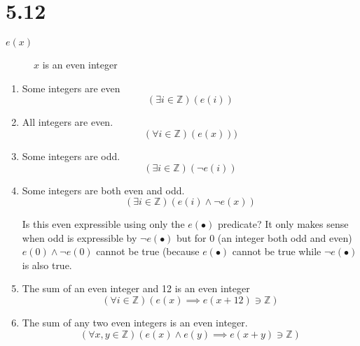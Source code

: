 \documentclass{article}
\begin{document}
\section*{5.12}
\begin{description}
\item[$e(x)$] $x$ is an even integer
\end{description}

\begin{enumerate}[label=\alph*)]
\item 
Some integers are even
\[ (\exists i \in \mathbb{Z})(e(i)) \]

\item 
All integers are even.
\[ (\forall i \in \mathbb{Z})(e(x))) \]

\item 
Some integers are odd.
\[ (\exists i \in \mathbb{Z})(\neg e(i)) \]

\item 
Some integers are both even and odd.
\[ (\exists i \in \mathbb{Z})(e(i) \land \neg e(x)) \]

Is this even expressible using only the $e(\bullet)$ predicate? It only makes sense when odd is expressible by $\neg e(\bullet)$ but for 0 (an integer both odd and even) $e(0) \land \neg e(0)$ cannot be true (because $e(\bullet)$ cannot be true while $\neg e(\bullet)$ is also true.

\item 
The sum of an even integer and 12 is an even integer
\[ (\forall i \in \mathbb{Z})(e(x) \implies e(x + 12) \ni \mathbb{Z}) \]

\item 
The sum of any two even integers is an even integer.
\[ (\forall x, y \in \mathbb{Z})(e(x) \land e(y) \implies e(x + y) \ni \mathbb{Z}) \]
\end{enumerate}
\end{document}
